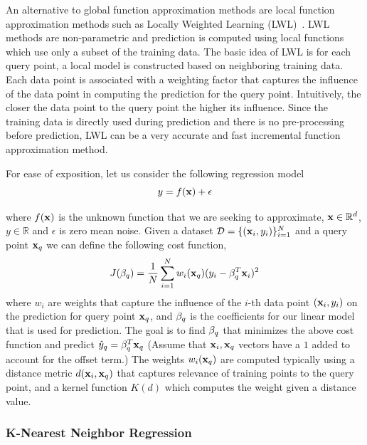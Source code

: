 An alternative to global function approximation methods are local
function approximation methods such as Locally Weighted Learning
(LWL)~\cite{DBLP:journals/air/AtkesonMS97a,
  DBLP:journals/air/AtkesonMS97}. LWL methods are 
non-parametric and prediction is computed using local functions which
use only a subset of the training data. The basic idea of LWL is for
each query point, a local model is constructed based on
neighboring training data. Each data point is associated with a
weighting factor that captures the influence of the data point in
computing the prediction for the query point. Intuitively, the closer
the data point to the query point the higher its influence. Since the
training data is directly used during prediction and there is no
pre-processing before prediction, LWL can be a very accurate and fast
incremental function approximation method.

For ease of exposition, let us consider the following regression
model
\begin{equation}
  \label{eq:12}
  y = f(\mathbf{x}) + \epsilon
\end{equation}

where $f(\mathbf{x})$ is the unknown function that we are seeking to
approximate, $\mathbf{x} \in \mathbb{R}^d$, $y \in \mathbb{R}$ and
$\epsilon$ is zero mean noise. Given a dataset
$\mathcal{D} = \{(\mathbf{x}_i, y_i)\}_{i=1}^N$ and a query point $\mathbf{x}_q$ we can define
the following cost function,
\begin{equation}
  \label{eq:13}
  J(\beta_q) = \frac{1}{N}\sum_{i=1}^N w_i(\mathbf{x}_q)(y_i - \mathbf{\beta}_q^T\mathbf{x}_i)^2
\end{equation}
where $w_i$ are weights that capture the influence of the $i$-th data
point $(\mathbf{x}_i, y_i)$ on the prediction for query point $\mathbf{x}_q$, and
$\mathbf{\beta}_q$ is the coefficients for our linear model that is used for
prediction. The goal is to find $\mathbf{\beta}_q$ that minimizes the above
cost function and predict $\hat{y}_q = \mathbf{\beta}_q^T\mathbf{x}_q$ (Assume
that $\mathbf{x}_i, \mathbf{x}_q$ vectors have a $1$ added to account for the
offset term.) The weights $w_i(\mathbf{x}_q)$ are computed typically using
a distance metric $d(\mathbf{x}_i, \mathbf{x}_q)$ that captures relevance of
training points to the query point, and a kernel function $K(d)$ which
computes the weight given a distance value.

\subsubsection{K-Nearest Neighbor Regression}
\label{sec:k-nearest-neighbor}

